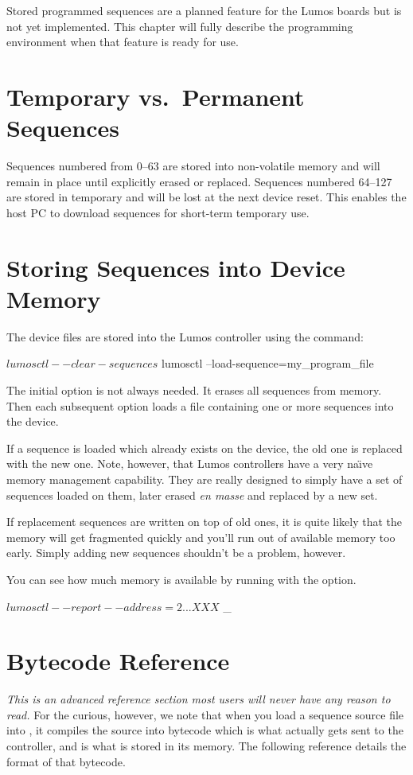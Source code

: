 \documentclass[letterpaper,twoside,onecolumn,openright,final]{memoir}
\begin{document}
\begin{NotImplemented*}{Stored programmed sequences are a planned feature for the Lumos boards but is not
yet implemented.  This chapter will fully describe the programming environment when that feature is
ready for use.}
\section{Temporary vs.\ Permanent Sequences}
Sequences numbered from 0--63 are stored into non-volatile  memory and will remain
in place until explicitly erased or replaced.  Sequences numbered 64--127 are stored in temporary 
 and will be lost at the next device reset.  This enables the host PC to download
sequences for short-term temporary use.

\section{Storing Sequences into Device Memory}
The device files are stored into the Lumos controller using the  command:
\begin{SourceCode}
$ lumosctl --clear-sequences
$ lumosctl --load-sequence=my_program_file
\end{SourceCode}

The initial  option is not always needed.  It erases all sequences
from memory.  Then each subsequent  option loads a file containing one
or more sequences into the device.

If a sequence is loaded which already exists on the device, the old one is replaced with the
new one.  Note, however, that Lumos controllers have a very na\"\i ve memory management capability.
They are really designed to simply have a set of sequences loaded on them, later erased
\emph{en masse} and replaced by a new set.

If replacement sequences are written on top of old ones, it is quite likely that the memory
will get fragmented quickly and you'll run out of available memory too early.
Simply adding new sequences shouldn't be a problem, however.

You can see how much memory is available by running  with the  
option.
\begin{SourceCode}
$ lumosctl --report --address=2
...
XXX
$ _
\end{SourceCode}

\section{Bytecode Reference}\label{sec:bytecode}
\emph{This is an advanced reference section most users will never have any reason to 
read.}  For the curious, however, we note that when you load a sequence source file
into , it compiles the source into bytecode which is what actually gets 
sent to the controller, and is what is stored in its memory.  The following reference
details the format of that bytecode.


\end{NotImplemented*}
\end{document}
